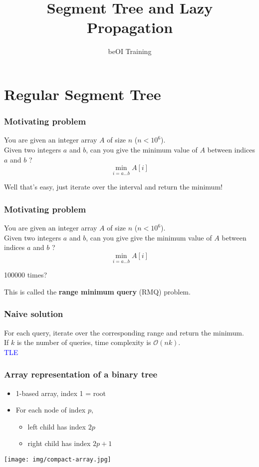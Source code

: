 \documentclass[12pt]{beamer}
\title{Segment Tree and Lazy Propagation}
\author{beOI Training}
\institute{\texttt{[image: ../share/beoi-logo]}}
\newcommand{\bigoh}{\mathcal{O}}
\begin{document}
\frame{\titlepage}

\section{Regular Segment Tree}

\begin{frame}

\frametitle{Motivating problem}

You are given an integer array $A$ of size $n$ ($n < 10^6$).\\
Given two integers $a$ and $b$, can you give the minimum value of $A$ between indices $a$ and $b$ ?
\[
    \min_{i = a\ldots b} A[i]
\]

Well that's easy, just iterate over the interval and return the minimum!

\end{frame}

\begin{frame}

\frametitle{Motivating problem}

You are given an integer array $A$ of size $n$ ($n < 10^6$).\\
Given two integers $a$ and $b$, can you give give the minimum value of $A$ between indices $a$ and $b$ ?
\[
    \min_{i = a\ldots b} A[i]
\]

\begin{center}
\huge{100000 times?} 
\end{center}

This is called the \textbf{range minimum query} (RMQ) problem.

\end{frame}

\begin{frame}
    \frametitle{Naive solution}
    For each query, iterate over the corresponding range and return the minimum. \\
    If $k$ is the number of queries, time complexity is $\bigoh(nk)$. \\
    \textcolor{blue}{TLE}
\end{frame}

\begin{frame}
    \frametitle{Array representation of a binary tree}
    \begin{itemize}
        \item 1-based array, index 1 = root
        \item For each node of index $p$,
        \begin{itemize}
            \item left child has index $2p$
            \item right child has index $2p+1$
        \end{itemize}
    \end{itemize}
    \begin{center}
        \texttt{[image: img/compact-array.jpg]}
    \end{center}
\end{frame}
\end{document}

